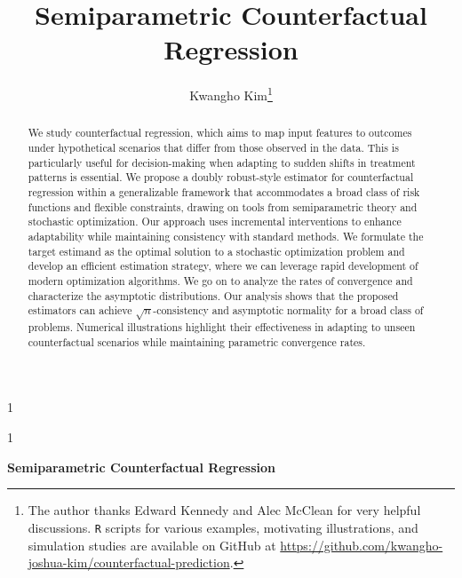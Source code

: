 \documentclass[12pt]{article}
\newcommand{\blind}{1}
\begin{document}
%

\def\spacingset#1{\renewcommand{\baselinestretch}%
{#1}\small\normalsize} \spacingset{1}



\blind
{
  \title{\LARGE \bf Semiparametric Counterfactual Regression}
  \author{
  Kwangho Kim\thanks{The author thanks Edward Kennedy and Alec McClean for very helpful discussions. \texttt{R} scripts for various examples, motivating illustrations, and simulation studies are available on GitHub at \url{https://github.com/kwangho-joshua-kim/counterfactual-prediction}.} 
}
  \date{}
  \maketitle
} \fi


\blind
{
  \bigskip
  \bigskip
  \bigskip
  \begin{center}
    {\LARGE\bf Semiparametric Counterfactual Regression}
\end{center}
  \medskip
} \fi

\bigskip
\begin{abstract}
We study counterfactual regression, which aims to map input features to outcomes under hypothetical scenarios that differ from those observed in the data. This is particularly useful for decision-making when adapting to sudden shifts in treatment patterns is essential. We propose a doubly robust-style estimator for counterfactual regression within a generalizable framework that accommodates a broad class of risk functions and flexible constraints, drawing on tools from semiparametric theory and stochastic optimization. Our approach uses incremental interventions to enhance adaptability while maintaining consistency with standard methods. We formulate the target estimand as the optimal solution to a stochastic optimization problem and develop an efficient estimation strategy, where we can leverage rapid development of modern optimization algorithms. We go on to analyze the rates of convergence and characterize the asymptotic distributions. Our analysis shows that the proposed estimators can achieve $\sqrt{n}$-consistency and asymptotic normality for a broad class of problems. Numerical illustrations highlight their effectiveness in adapting to unseen counterfactual scenarios while maintaining parametric convergence rates.
\end{abstract}
\end{document}
